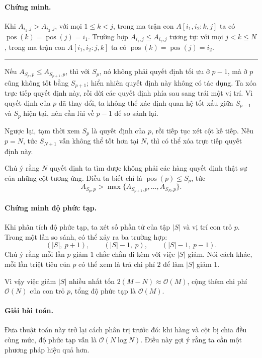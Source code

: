 \documentclass[11pt]{article}
\newcommand{\Oh}{\mathcal{O}}
\newcommand{\qedmark}{\hfill\rule{0.7ex}{0.7ex}}
\begin{document}
\paragraph{Chứng minh.}
Khi \(A_{i_1,j}>A_{i_2,j}\), với mọi \(1\le k<j\), trong ma trận con
\(A[i_1,i_2:k,j]\) ta có
\(\operatorname{pos}(k)=\operatorname{pos}(j)=i_1\). Trường hợp
\(A_{i_1,j}\le A_{i_2,j}\) tương tự: với mọi \(j<k\le N\), trong ma trận con
\(A[i_1,i_2:j,k]\) ta có
\(\operatorname{pos}(k)=\operatorname{pos}(j)=i_2\). \qedmark

Nếu \(A_{S_p,p}\le A_{S_{p+1},p}\), thì với \(S_p\), nó không phải quyết định
tối ưu ở \(p-1\), mà ở \(p\) cũng không tốt bằng \(S_{p+1}\); hiển nhiên quyết
định này không có tác dụng. Ta xóa trực tiếp quyết định này, rồi dời các quyết
định phía sau sang trái một vị trí. Vì quyết định của \(p\) đã thay đổi, ta
không thể xác định quan hệ tốt xấu giữa \(S_{p-1}\) và \(S_p\) hiện tại, nên
cần lùi về \(p-1\) để so sánh lại.

Ngược lại, tạm thời xem \(S_p\) là quyết định của \(p\), rồi tiếp tục xét cột
kế tiếp. Nếu \(p=N\), tức \(S_{N+1}\) vẫn không thể tốt hơn tại \(N\), thì có
thể xóa trực tiếp quyết định này.

Chú ý rằng \(N\) quyết định ta tìm được không phải các hàng quyết định thật sự
của những cột tương ứng. Điều ta biết chỉ là
\(\operatorname{pos}(p)\le S_p\), tức
\[
  A_{S_p,p}> \max\{A_{S_{p+1},p},\ldots,A_{S_N,p}\}.
\]

\paragraph{Chứng minh độ phức tạp.}
Khi phân tích độ phức tạp, ta xét số phần tử của tập \(|S|\) và vị trí con trỏ
\(p\). Trong một lần so sánh, có thể xảy ra ba trường hợp:
\[
  (|S|,\ p+1),\qquad (|S|-1,\ p),\qquad (|S|-1,\ p-1).
\]
Chú ý rằng mỗi lần \(p\) giảm \(1\) chắc chắn đi kèm với việc \(|S|\) giảm.
Nói cách khác, mỗi lần triệt tiêu của \(p\) có thể xem là trả chi phí \(2\) để
làm \(|S|\) giảm \(1\).

Vì vậy việc giảm \(|S|\) nhiều nhất tốn
\(2(M-N)\approx \Oh(M)\), cộng thêm chi phí \(\Oh(N)\) của con trỏ \(p\), tổng
độ phức tạp là \(\Oh(M)\).

\paragraph{Giải bài toán.}
Đưa thuật toán này trở lại cách phân trị trước đó: khi hàng và cột bị chia
đều cùng mức, độ phức tạp vẫn là \(\Oh(N\log N)\). Điều này gợi ý rằng ta cần
một phương pháp hiệu quả hơn.
\end{document}
